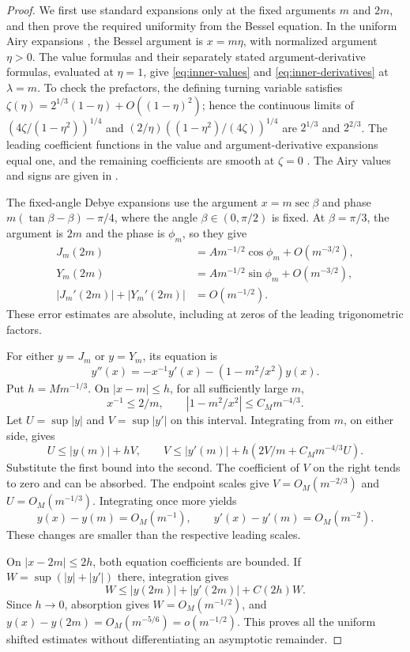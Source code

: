 \documentclass[11pt]{article}
\begin{document}
\begin{proof}
We first use standard expansions only at the fixed arguments \(m\) and
\(2m\), and then prove the required uniformity from the Bessel equation.
In the uniform Airy expansions
\cite[Eqs.~10.20.4, 10.20.5, 10.20.7, 10.20.8]{DLMF}, the Bessel
argument is \(x=m\eta\), with normalized argument \(\eta>0\).
The value formulas and their separately stated argument-derivative
formulas, evaluated at \(\eta=1\), give \eqref{eq:inner-values} and
\eqref{eq:inner-derivatives} at \(\lambda=m\).
To check the prefactors, the defining turning variable satisfies
\(\zeta(\eta)=2^{1/3}(1-\eta)+O((1-\eta)^2)\); hence the continuous limits of
\((4\zeta/(1-\eta^2))^{1/4}\) and
\((2/\eta)((1-\eta^2)/(4\zeta))^{1/4}\) are \(2^{1/3}\) and
\(2^{2/3}\). The leading coefficient functions in the value and
argument-derivative expansions equal one, and the remaining coefficients
are smooth at \(\zeta=0\)
\cite[Eqs.~10.20.10--10.20.14]{DLMF}.
The Airy values and signs are given in
\cite[Eqs.~9.2.3--9.2.6]{DLMF}.

The fixed-angle Debye expansions
\cite[Eqs.~10.19.5--10.19.7]{DLMF} use the argument \(x=m\sec\beta\)
and phase \(m(\tan\beta-\beta)-\pi/4\), where the angle
\(\beta\in(0,\pi/2)\) is fixed. At \(\beta=\pi/3\), the argument is
\(2m\) and the phase is \(\phi_m\), so they give
\[
\begin{aligned}
J_m(2m)&=A m^{-1/2}\cos\phi_m+O(m^{-3/2}),\\
Y_m(2m)&=A m^{-1/2}\sin\phi_m+O(m^{-3/2}),\\
|J_m'(2m)|+|Y_m'(2m)|&=O(m^{-1/2}).
\end{aligned}
\]
These error estimates are absolute, including at zeros of the leading
trigonometric factors.

For either \(y=J_m\) or \(y=Y_m\), its equation is
\[
y''(x)=-x^{-1}y'(x)-(1-m^2/x^2)y(x).
\]
Put \(h=M m^{-1/3}\). On \(|x-m|\le h\), for all sufficiently large \(m\),
\[
x^{-1}\le2/m,\qquad |1-m^2/x^2|\le C_M m^{-4/3}.
\]
Let \(U=\sup|y|\) and \(V=\sup|y'|\) on this interval. Integrating from
\(m\), on either side, gives
\[
U\le |y(m)|+hV,\qquad
V\le |y'(m)|+h(2V/m+C_M m^{-4/3}U).
\]
Substitute the first bound into the second. The coefficient of \(V\) on
the right tends to zero and can be absorbed. The endpoint scales give
\(V=O_M(m^{-2/3})\) and \(U=O_M(m^{-1/3})\). Integrating once more yields
\[
y(x)-y(m)=O_M(m^{-1}),\qquad
y'(x)-y'(m)=O_M(m^{-2}).
\]
These changes are smaller than the respective leading scales.

On \(|x-2m|\le2h\), both equation coefficients are bounded. If
\(W=\sup(|y|+|y'|)\) there, integration gives
\[
W\le |y(2m)|+|y'(2m)|+C(2h)W.
\]
Since \(h\to0\), absorption gives \(W=O_M(m^{-1/2})\), and
\(y(x)-y(2m)=O_M(m^{-5/6})=o(m^{-1/2})\). This proves all the
uniform shifted estimates without differentiating an asymptotic remainder.
\end{proof}
\end{document}
